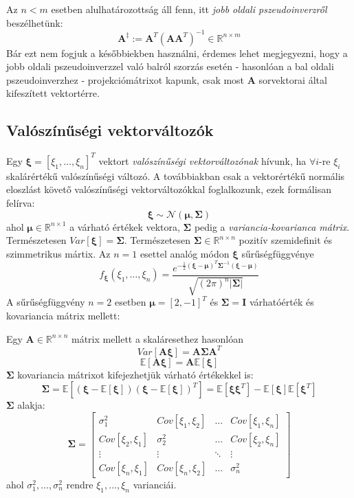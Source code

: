 \documentclass[14p]{report}
\def\pmb{\boldsymbol}
\begin{document}
Az $n < m$ esetben alulhatározottság áll fenn, itt \emph{jobb oldali pszeudoinverzről} beszélhetünk:
\[
	\pmb{A}^{\ddagger} := \pmb{A}^T(\pmb{A}\pmb{A}^T)^{-1} \in \mathbb{R}^{n \times m}
\]
Bár ezt nem fogjuk a későbbiekben használni, érdemes lehet megjegyezni, hogy a jobb oldali pszeudoinverzzel való balról szorzás esetén - hasonlóan a bal oldali pszeudoinverzhez - projekciómátrixot kapunk, csak most $\pmb{A}$ sorvektorai által kifeszített vektortérre.
\subsection{Valószínűségi vektorváltozók}
Egy $\pmb{\xi} = [\xi_1, \dots , \xi_n]^T$ vektort \emph{valószínűségi vektorváltozónak} hívunk, ha $\forall i$-re $\xi_i$ skalárértékű valószínűségi változó. A továbbiakban csak a vektorértékű normális eloszlást követő valószínűségi vektorváltozókkal foglalkozunk, ezek formálisan felírva:
\[
	\pmb{\xi} \sim \mathcal{N}(\pmb{\mu}, \pmb{\Sigma})
\]
ahol $\pmb{\mu} \in \mathbb{R}^{n \times 1}$ a várható értékek vektora, $\pmb{\Sigma}$ pedig a \emph{variancia-kovarianca mátrix}. Természetesen $Var[\pmb{\xi}] = \pmb{\Sigma}$. Természetesen $\pmb{\Sigma} \in \mathbb{R}^{n \times n}$ pozitív szemidefinit és szimmetrikus mártix. Az $n = 1$ esettel analóg módon $\pmb{\xi}$ sűrűségfüggvénye
\[
	f_{\pmb{\xi}}(\xi_1, \dots, \xi_n) = \frac{ e^{-\frac{1}{2}(\pmb{\xi}-\pmb{\mu})^T\pmb{\Sigma}^{-1}(\pmb{\xi}-\pmb{\mu})}}{\sqrt{(2\pi)^n|\pmb{\Sigma}|}}
\]
A sűrűségfüggvény $n = 2$ esetben $\pmb{\mu} = [2, -1]^T$ és $\pmb{\Sigma} = \pmb{I}$ várhatóérték és kovariancia mátrix mellett: 
\def\centerx{2}
\def\centery{-1}

\begin{center}
\end{center} 
Egy $\pmb{A} \in \mathbb{R}^{n \times n}$ mátrix mellett a skaláresethez hasonlóan 
\[
	Var[\pmb{A}\pmb{\xi}] = \pmb{A} \pmb{\Sigma} \pmb{A}^T
\]
\[
	\mathbb{E}[\pmb{A}\pmb{\xi}] = \pmb{A}\mathbb{E}[\pmb{\xi}]
\]
$\pmb{\Sigma}$ kovariancia mátrixot kifejezhetjük várható értékekkel is:
\[
	\pmb{\Sigma} = \mathbb{E}[(\pmb{\xi}-\mathbb{E}[\pmb{\xi}])(\pmb{\xi}-\mathbb{E}[\pmb{\xi}])^T] = \mathbb{E}[\pmb{\xi}\pmb{\xi}^T] - \mathbb{E}[\pmb{\xi}]\mathbb{E}[\pmb{\xi}^T]
\]
$\pmb{\Sigma}$ alakja:
\[
	\pmb{\Sigma} = 
	\begin{bmatrix}
	\sigma_1^2 & Cov[\xi_1,\xi_2] & \dots & Cov[\xi_1,\xi_n] \\
	Cov[\xi_2,\xi_1] & \sigma_2^2 & \dots & Cov[\xi_2,\xi_n] \\
	\vdots & \vdots & \ddots & \vdots \\
	Cov[\xi_n,\xi_1] & Cov[\xi_n,\xi_2] & \dots & \sigma_n^2
	\end{bmatrix}
\]
ahol $\sigma_1^2, \dots, \sigma_n^2$ rendre $\xi_1, \dots, \xi_n$ varianciái.
\end{document}
